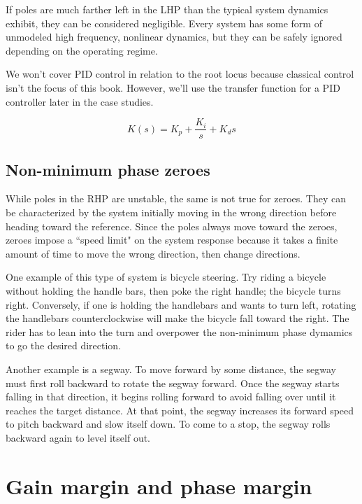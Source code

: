 \begin{remark}
  If poles are much farther left in the LHP than the typical \gls{system}
  dynamics exhibit, they can be considered negligible. Every \gls{system} has
  some form of unmodeled high frequency, nonlinear dynamics, but they can be
  safely ignored depending on the operating regime.
\end{remark}

We won't cover PID control in relation to the root locus because classical
control isn't the focus of this book. However, we'll use the transfer function
for a PID controller later in the case studies.

\begin{equation*}
  K(s) = K_p + \frac{K_i}{s} + K_ds
\end{equation*}

\subsection{Non-minimum phase zeroes}

While poles in the RHP are unstable, the same is not true for zeroes. They can
be characterized by the \gls{system} initially moving in the wrong direction
before heading toward the \gls{reference}. Since the poles always move toward
the zeroes, zeroes impose a ``speed limit" on the \gls{system} response because
it takes a finite amount of time to move the wrong direction, then change
directions.

One example of this type of system is bicycle steering. Try riding a bicycle
without holding the handle bars, then poke the right handle; the bicycle turns
right. Conversely, if one is holding the handlebars and wants to turn left,
rotating the handlebars counterclockwise will make the bicycle fall toward the
right. The rider has to lean into the turn and overpower the non-minimum phase
dymamics to go the desired direction.

Another example is a segway. To move forward by some distance, the segway must
first roll backward to rotate the segway forward. Once the segway starts falling
in that direction, it begins rolling forward to avoid falling over until
it reaches the target distance. At that point, the segway increases its forward
speed to pitch backward and slow itself down. To come to a stop, the segway
rolls backward again to level itself out.

\section{Gain margin and phase margin} \label{sec:gain-phase-margin}

